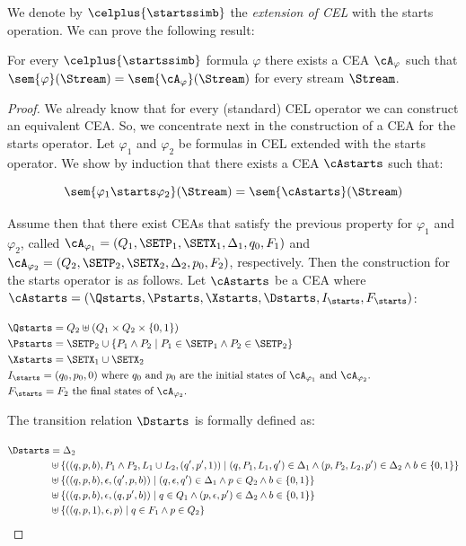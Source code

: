 We denote by $\celplus{\startssimb}$ the \emph{extension of CEL} with the starts operation. We can prove the following result:

\begin{theorem} \label{theo:mytheorem}
	For every $\celplus{\startssimb}$ formula $\varphi$ there exists a CEA $\cA_\varphi$ such that $\sem{\varphi}(\Stream) = \sem{\cA_\varphi}(\Stream)$ for every stream $\Stream$.
\end{theorem}

\begin{proof}
	We already know that for every (standard) CEL operator we can construct an equivalent CEA. So, we concentrate next in the construction of a CEA for the starts operator.
	Let $\varphi_1$ and $\varphi_2$ be formulas in CEL extended with the starts operator. We show by induction that there exists a CEA $\cAstarts$ such that:
	
	
	$$\sem{\varphi_1 \starts \varphi_2}(\Stream) = \sem{\cAstarts}(\Stream)$$
	
	
	Assume then that there exist CEAs that satisfy the previous property for $\varphi_1$ and $\varphi_2$, called $\cA_{\varphi_1} = (Q_1, \SETP_1, \SETX_1, \Delta_1, q_0, F_1)$ and $\cA_{\varphi_2} = (Q_2, \SETP_2, \SETX_2, \Delta_2, p_0, F_2)$, respectively.
	Then the construction for the starts operator is as follows.
	Let $\cAstarts$ be a CEA where $\cAstarts = (\Qstarts, \Pstarts, \Xstarts, \Dstarts, I_{\starts}, F_{\starts})$:
	
	
	$$\begin{aligned}[t] 		& \Qstarts = Q_2 \uplus (Q_1 \times Q_2 \times \{0, 1\}) \\ 		& \Pstarts = \SETP_2 \cup \{ P_1 \land P_2 \mid P_1 \in \SETP_1 \land P_2 \in \SETP_2 \} \hspace*{155px}\\ 		& \Xstarts  = \SETX_1 \cup \SETX_2 \\ 		& I_{\starts} = (q_0, p_0, 0) \text{ where } q_0 \text{ and } p_0 \text{ are the initial states of } \cA_{\varphi_1} \text{ and } \cA_{\varphi_2}.\\ 		& F_{\starts} = F_2 \text{ the final states of } \cA_{\varphi_2}. 	\end{aligned}$$
	
	
	The transition relation $\Dstarts$ is formally defined as:
	
	
	$$\begin{aligned}[t] 		\Dstarts & = \Delta_2\\ 		& \uplus \{((q, p, b), P_1 \land P_2, L_1 \cup L_2, (q', p', 1)) \mid (q, P_1, L_1, q') \in \Delta_1 \land (p, P_2, L_2, p') \in \Delta_2 \land b \in \{0, 1\}\} \\ 		& \uplus \{((q, p, b), \epsilon, (q', p, b)) \mid (q, \epsilon, q') \in \Delta_1 \land p \in Q_2 \land b \in \{0, 1\}\}  \\ 		& \uplus \{((q, p, b), \epsilon, (q, p', b)) \mid q \in Q_1 \land (p, \epsilon, p') \in \Delta_2 \land b \in \{0, 1\}\}  \\ 		& \uplus \{((q, p, 1), \epsilon, p) \mid q \in F_1 \land p \in Q_2\} 	\end{aligned}$$
	

\end{proof}
